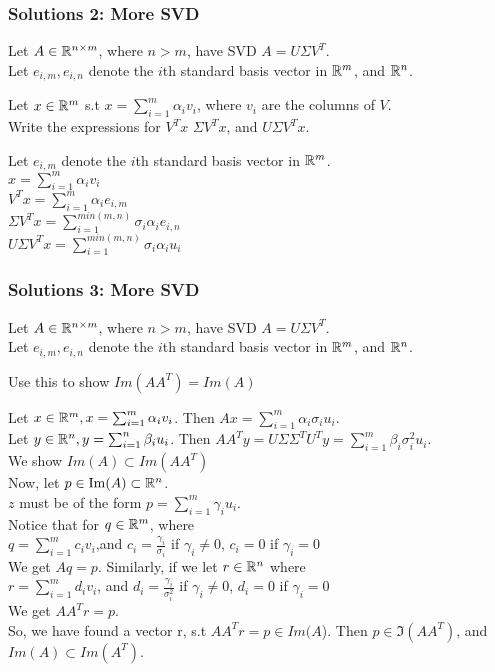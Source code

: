 \documentclass{beamer}
\renewenvironment{enumerate}%
{\begin{list}{\arabic{enumi}.}%
      {\setlength{\leftmargin}{2.5em}%
       \setlength{\itemsep}{-\parsep}%
       \setlength{\topsep}{-\parskip}%
       \usecounter{enumi}}%
 }{\end{list}}
\begin{document}
\begin{frame}
\frametitle{Solutions 2: More SVD}
Let $A\in \mathbb{R}^{n\times m}$, where $n>m$, have SVD $A=U\Sigma V^T$.\\ 
Let $e_{i,m}, e_{i,n}$ denote the $i$th standard basis vector in $\mathbb{R}^m$, and $\mathbb{R}^n$.
\begin{enumerate}
\item[2.] Let $x\in \mathbb{R}^m$ s.t $x = \sum_{i=1}^m\alpha_i v_i$, where $v_i$ are the columns of $V$.\\ Write the expressions for $V^Tx$ $\Sigma V^Tx$, and $U\Sigma V^Tx$.
\begin{solution}
Let $e_{i,m}$ denote the $i$th standard basis vector in $\mathbb{R}^m$. \\
$x = \sum_{i=1}^m\alpha_i v_i$\\
$V^Tx = \sum_{i=1}^m\alpha_i e_{i,m}$ \\
$\Sigma V^Tx = \sum_{i=1}^{min(m,n)} \sigma_i \alpha_i e_{i,n}$ \\
$U \Sigma V^Tx = \sum_{i=1}^{min(m,n)} \sigma_i \alpha_i u_i$ \\
\end{solution}
\end{enumerate}
\end{frame}

\begin{frame}
\frametitle{Solutions 3: More SVD}
Let $A\in \mathbb{R}^{n\times m}$, where $n>m$, have SVD $A=U\Sigma V^T$.\\ 
Let $e_{i,m}, e_{i,n}$ denote the $i$th standard basis vector in $\mathbb{R}^m$, and $\mathbb{R}^n$.
\begin{enumerate}
\item[3.] Use this to show $Im(AA^T) = Im(A)$
\begin{solution}
Let $x \in \mathbb{R}^m, x = \sum_{i=1}^m \alpha_i v_i$. Then $Ax =  \sum_{i=1}^m \alpha_i \sigma_i u_i$. \\
Let $y \in \mathbb{R}^n, y = \sum_{i=1}^n \beta_i u_i$. Then $AA^Ty = U\Sigma\Sigma^TU^Ty = \sum_{i=1}^m \beta_i \sigma_i^2 u_i$.\\

We show $Im(A) \subset Im(AA^T)$\\
Now, let $p \in {{\rm Im}}(A) \subset\mathbb{R}^n$.\\
$z$ must be of the form $p = \sum_{i=1}^m \gamma_i u_i$. \\
Notice that for $q\in \mathbb{R}^m$, where\\
\quad  $q = \sum_{i=1}^m c_i v_i$,\quad and \quad $c_i = \frac{\gamma_i}{\sigma_i}$ if $\gamma_i\neq 0$, $c_i = 0$ if $\gamma_i=0$\\
We get $Aq = p$.
Similarly, if we let $r\in \mathbb{R}^n$ where\\
\quad $r =  \sum_{i=1}^m d_i v_i$, \quad and \quad $d_i = \frac{\gamma_i}{\sigma_i^2}$ if $\gamma_i\neq 0$, $d_i = 0$ if $\gamma_i=0$\\
We get $AA^Tr = p$.\\
So, we have found a vector r, s.t $AA^Tr = p\in Im(A$). Then $p \in \Im(AA^T)$, and $Im(A)\subset Im(A^T).$
\end{solution}
\end{enumerate}
\end{frame}
\end{document}
